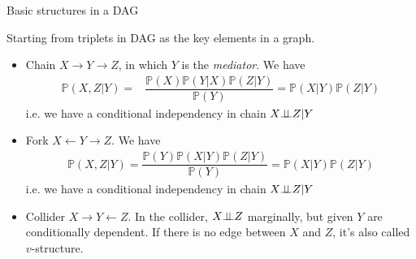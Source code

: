 \begin{point}
    Basic structures in a DAG 
\end{point}

Starting from triplets in DAG as the key elements in a graph.
\begin{itemize}[topsep=2pt,itemsep=0pt]
    \item Chain $ X\to Y\to Z $, in which $ Y $ is the \textit{mediator}. We have
    \begin{align*}
        \mathbb{P}\left( X,Z|Y \right)=&\dfrac{\mathbb{P}\left( X \right) \mathbb{P}\left( Y|X \right) \mathbb{P}\left( Z|Y \right) }{\mathbb{P}\left( Y \right) }=\mathbb{P}\left( X|Y \right) \mathbb{P}\left( Z|Y \right) 
    \end{align*}
    i.e. we have a conditional independency in chain $ X\bot\!\!\!\bot Z|Y $
    \item Fork $ X\leftarrow Y\rightarrow Z $. We have
    \begin{align*}
        \mathbb{P}\left( X,Z|Y \right) = \dfrac{\mathbb{P}\left( Y \right) \mathbb{P}\left( X|Y \right) \mathbb{P}\left( Z|Y \right) }{\mathbb{P}\left( Y \right) }=\mathbb{P}\left( X|Y \right) \mathbb{P}\left( Z|Y \right)   
    \end{align*}
    i.e. we have a conditional independency in chain $ X\bot\!\!\!\bot Z|Y $
    \item Collider $ X \to Y \leftarrow Z $. In the collider, $ X\bot\!\!\!\bot Z $ marginally, but given $ Y $ are conditionally dependent. If there is no edge between $ X $ and $ Z $, it's also called $ v $-structure.
\end{itemize}

